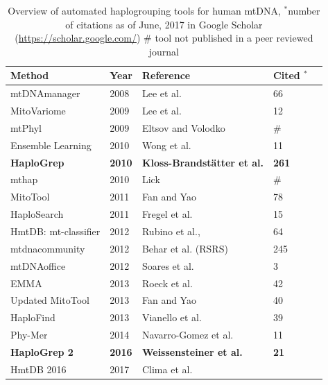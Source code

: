 \begin{table}
  \begin{tabular}{lllll}
    \toprule
    Method  & Year &  Reference & Cited $^*$\\ 
		\midrule
		mtDNAmanager & 2008 & Lee et al. \cite{Lee2008} & 66\\ 
		MitoVariome & 2009  & Lee et al. \cite{Lee2009} & 12\\
		mtPhyl & 2009 &  Eltsov and Volodko \cite{eltsov2009mtphyl} & \#\\
		Ensemble Learning & 2010 &  Wong et al. \cite{Wong2011} & 11  \\ 
		\textbf{HaploGrep} & \textbf{2010} & \textbf{Kloss-Brandst{\"a}tter et al.} \cite{Kloss-Brandstatter2011} & \textbf{261}  \\ 
		mthap & 2010 & Lick& \# \\ 
		MitoTool & 2011 & Fan and Yao \cite{Fan2011} & 78\\
		HaploSearch & 2011 & Fregel et al. \cite{Fregel2011}  & 15 \\
		HmtDB: mt-classifier & 2012 & Rubino et al., \cite{Rubino2012}& 64 \\
		mtdnacommunity & 2012 & Behar et al. \cite{Behar2012} (RSRS) & 245\\
		mtDNAoffice & 2012 & Soares et al. \cite{Soares2012} & 3 \\
		EMMA & 2013 & Roeck et al. \cite{Rock2013} & 42\\
		Updated MitoTool& 2013& Fan and Yao \cite{Fan2013} & 40\\
		HaploFind & 2013 & Vianello et al. \cite{Vianello2013} & 39\\
		Phy-Mer & 2014 & Navarro-Gomez et al. \cite{Navarro-gomez2014} & 11\\
		\textbf{HaploGrep 2} & \textbf{2016} & \textbf{Weissensteiner et al.} \cite{Weissensteiner2016a}  & \textbf{21}\\
        HmtDB 2016  & 2017 & Clima et al. \cite{Clima2017}&  \\

		\bottomrule
\end{tabular}
\caption[Related work]{Overview of automated haplogrouping tools for human mtDNA, $^*$number of citations as of June, 2017 in Google Scholar (\url{https://scholar.google.com/}) \# tool not published in a peer reviewed journal} 
\label{table:tools}
\end{table}

